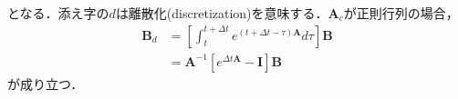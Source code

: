 となる．添え字の$d$は離散化(discretization)を意味する．$\mathbf{A}_c$が正則行列の場合，
$$
\begin{aligned}
\mathbf{B}_d &= \left[\int_t^{t+\Delta t} e^{(t+\Delta t-\tau)\mathbf{A}} d\tau\right] \mathbf{B}\\
&=\mathbf{A}^{-1}\left[e^{\Delta t \mathbf{A}}-\mathbf{I}\right]\mathbf{B}
\end{aligned}
$$
が成り立つ．